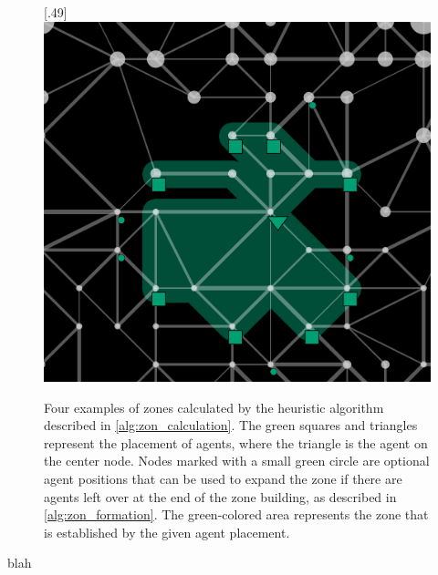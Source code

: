 \begin{figure}
  [.49\linewidth]{\includegraphics[width=.49\linewidth]{images/zone4.png}}
  \caption{Four examples of zones calculated by the heuristic algorithm described in \autoref{alg:zon_calculation}. The green squares and triangles represent the placement of agents, where the triangle is the agent on the center node. Nodes marked with a small green circle are optional agent positions that can be used to expand the zone if there are agents left over at the end of the zone building, as described in \autoref{alg:zon_formation}. The green-colored area represents the zone that is established by the given agent placement.}
  \label{fig:zones}
\end{figure}
blah

